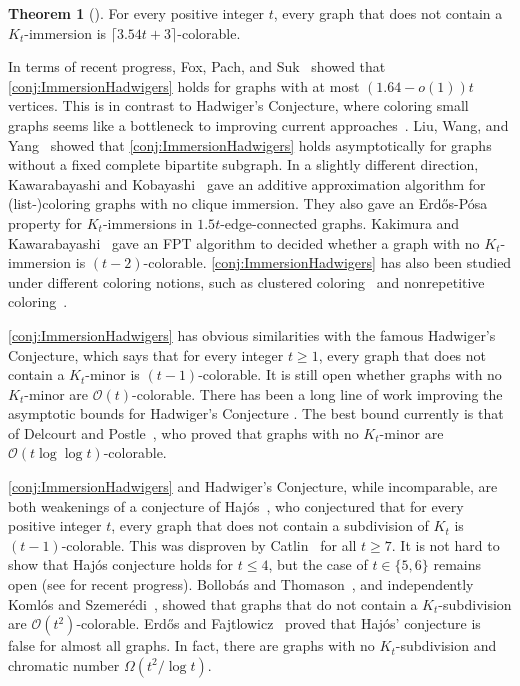 \documentclass{article}
\theoremstyle{definition}
\newtheorem{theorem}[environment]{Theorem}
\begin{document}
\begin{theorem}[{\cite[Theorem~1.6]{Gauthier2019Forcing}}]\label{thm:coloringNoImmersion}
    For every positive integer $t$, every graph that does not contain a $K_t$-immersion is $\lceil3.54t + 3\rceil$-colorable.
\end{theorem}

In terms of recent progress, Fox, Pach, and Suk~\cite{fox2025immersions} showed that \cref{conj:ImmersionHadwigers} holds for graphs with at most $(1.64 - o(1))t$ vertices. This is in contrast to Hadwiger's Conjecture, where coloring small graphs seems like a bottleneck to improving current approaches~\cite{delcourt2025reducing}. Liu, Wang, and Yang~\cite{liu2022clique} showed that \cref{conj:ImmersionHadwigers} holds asymptotically for graphs without a fixed complete bipartite subgraph. In a slightly different direction, Kawarabayashi and Kobayashi~\cite{kawarabayashi2012list} gave an additive approximation algorithm for (list-)coloring graphs with no clique immersion. They also gave an Erd\H{o}s-P\'{o}sa property for $K_t$-immersions in $1.5t$-edge-connected graphs. Kakimura and Kawarabayashi~\cite{kakimura2016coloring} gave an FPT algorithm to decided whether a graph with no $K_t$-immersion is $(t-2)$-colorable. \cref{conj:ImmersionHadwigers} has also been studied under different coloring notions, such as clustered coloring~\cite{liu2023immersion} and nonrepetitive coloring~\cite{wollan2019nonrepetitive}.

\cref{conj:ImmersionHadwigers} has obvious similarities with the famous Hadwiger's Conjecture, which says that for every integer $t \geq 1$, every graph that does not contain a $K_{t}$-minor is $(t-1)$-colorable. It is still open whether graphs with no $K_t$-minor are $\mathcal{O}(t)$-colorable. There has been a long line of work improving the asymptotic bounds for Hadwiger's Conjecture \cite{kostochka1984lower, norin2023breaking, postle2020even, thomason1984extremal}. The best bound currently is that of Delcourt and Postle~\cite{delcourt2025reducing}, who proved that graphs with no $K_t$-minor are $\mathcal{O}(t\log\log t)$-colorable.

\cref{conj:ImmersionHadwigers} and Hadwiger's Conjecture, while incomparable, are both weakenings of a conjecture of Haj\'{o}s~\cite{Hajos1961uber}, who conjectured that for every positive integer $t$, every graph that does not contain a subdivision of $K_{t}$ is $(t-1)$-colorable. This was disproven by Catlin~\cite{Catlin1979hajos} for all $t \geq 7$. It is not hard to show that Haj\'{o}s conjecture holds for $t \leq 4$, but the case of $t \in \{5,6\}$ remains open (see \cite{he2020kelmans, xie20224} for recent progress). Bollob\'{a}s and Thomason~\cite{bollobas1998proof}, and independently Koml\'{o}s and Szemer\'{e}di~\cite{komlos1996topological}, showed that graphs that do not contain a $K_t$-subdivision are $\mathcal{O}(t^2)$-colorable. Erd\H{o}s and Fajtlowicz~\cite{erdHos1981conjecture} proved that Haj\'{o}s' conjecture is false for almost all graphs. In fact, there are graphs with no $K_t$-subdivision and chromatic number $\Omega(t^2/\log t)$.
\end{document}
